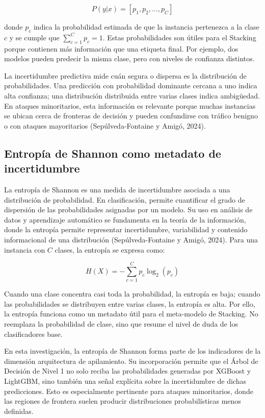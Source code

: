 \documentclass[12pt,a4paper]{article}
\begin{document}
\[
P(y|x) = [p_1, p_2, \ldots, p_C]
\]

donde $p_c$ indica la probabilidad estimada de que la instancia pertenezca a la clase $c$ y se cumple que $\sum_{c=1}^{C} p_c = 1$. Estas probabilidades son útiles para el Stacking porque contienen más información que una etiqueta final. Por ejemplo, dos modelos pueden predecir la misma clase, pero con niveles de confianza distintos.

La incertidumbre predictiva mide cuán segura o dispersa es la distribución de probabilidades. Una predicción con probabilidad dominante cercana a uno indica alta confianza; una distribución distribuida entre varias clases indica ambigüedad. En ataques minoritarios, esta información es relevante porque muchas instancias se ubican cerca de fronteras de decisión y pueden confundirse con tráfico benigno o con ataques mayoritarios (Sepúlveda-Fontaine y Amigó, 2024).

\subsection{Entropía de Shannon como metadato de incertidumbre}

La entropía de Shannon es una medida de incertidumbre asociada a una distribución de probabilidad. En clasificación, permite cuantificar el grado de dispersión de las probabilidades asignadas por un modelo. Su uso en análisis de datos y aprendizaje automático se fundamenta en la teoría de la información, donde la entropía permite representar incertidumbre, variabilidad y contenido informacional de una distribución (Sepúlveda-Fontaine y Amigó, 2024). Para una instancia con $C$ clases, la entropía se expresa como:

\[
H(X) = -\sum_{c=1}^{C} p_c \log_2(p_c)
\]

Cuando una clase concentra casi toda la probabilidad, la entropía es baja; cuando las probabilidades se distribuyen entre varias clases, la entropía es alta. Por ello, la entropía funciona como un metadato útil para el meta-modelo de Stacking. No reemplaza la probabilidad de clase, sino que resume el nivel de duda de los clasificadores base.

En esta investigación, la entropía de Shannon forma parte de los indicadores de la dimensión arquitectura de apilamiento. Su incorporación permite que el Árbol de Decisión de Nivel 1 no solo reciba las probabilidades generadas por XGBoost y LightGBM, sino también una señal explícita sobre la incertidumbre de dichas predicciones. Esto es especialmente pertinente para ataques minoritarios, donde las regiones de frontera suelen producir distribuciones probabilísticas menos definidas.
\end{document}
